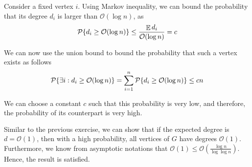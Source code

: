 \documentclass[11pt]{article}
\newenvironment{exercise}[2][Exercise]{\begin{trivlist}
\item[\hskip \labelsep {\bfseries #1}\hskip \labelsep {\bfseries #2.}]}{\end{trivlist}}
\newenvironment{solution}[1][Solution]{\begin{trivlist}
\item[\hskip \labelsep {\bfseries #1}\hskip \labelsep]}{\end{trivlist}}
\DeclareMathOperator*{\E}{\mathbb{E}}
\begin{document}
\begin{exercise}{2.4.2}
\end{exercise}

\begin{solution}
Consider a fixed vertex $i$. Using Markov inequality, we can bound the probability that its degree $d_i$ is larger than $\mathcal{O}(\log n)$, as
\begin{equation*}
\mathcal{P}\{ d_i \geq \mathcal{O}(\log n) \} \leq \frac{\E d_i}{\mathcal{O}(\log n)} = c \\
\end{equation*}

We can now use the union bound to bound the probability that such a vertex exists as follows
\begin{equation*}
\mathcal{P}\{\exists i : d_i \geq \mathcal{O}(\log n) \} = \sum_{i=1}^n\mathcal{P}\{d_i \geq \mathcal{O}(\log n) \}  \leq cn  \\
\end{equation*}

We can choose a constant $c$ such that this probability is very low, and therefore, the probability of its counterpart is very high.
\end{solution}

\begin{exercise}{2.4.3}
\end{exercise}

\begin{solution}
Similar to the previous exercise, we can show that if the expected degree is $d = \mathcal{O}(1)$, then with a high probability, all vertices of $G$ have degrees $\mathcal{O}(1)$. Furthermore, we know from asymptotic notations that $\mathcal{O}(1) \leq \mathcal{O}\left(\frac{\log n}{\log \log n}\right)$. Hence, the result is satisfied.
\end{solution}

\begin{exercise}{2.4.4}
\end{exercise}

\begin{solution}

\end{solution}

\begin{exercise}{2.4.5}
\end{exercise}

\begin{solution}

\end{solution}
\end{document}
